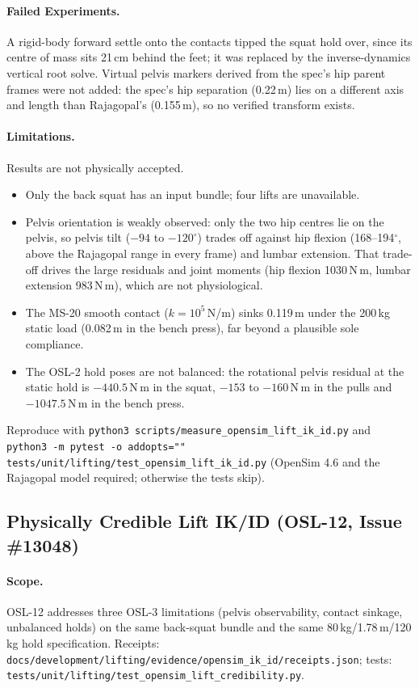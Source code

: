 \documentclass[11pt,a4paper]{article}
\begin{document}
\paragraph{Failed Experiments.} A rigid-body forward settle onto the contacts
tipped the squat hold over, since its centre of mass sits 21\,cm behind the
feet; it was replaced by the inverse-dynamics vertical root solve. Virtual
pelvis markers derived from the spec's hip parent frames were not added: the
spec's hip separation (0.22\,m) lies on a different axis and length than
Rajagopal's (0.155\,m), so no verified transform exists.

\paragraph{Limitations.} Results are not physically accepted.
\begin{itemize}[nosep]
\item Only the back squat has an input bundle; four lifts are unavailable.
\item Pelvis orientation is weakly observed: only the two hip centres lie on
  the pelvis, so pelvis tilt ($-94$ to $-120^\circ$) trades off against hip
  flexion (168--194$^\circ$, above the Rajagopal range in every frame) and
  lumbar extension. That trade-off drives the large residuals and joint
  moments (hip flexion 1030\,N\,m, lumbar extension 983\,N\,m), which are not
  physiological.
\item The MS-20 smooth contact ($k = 10^5$\,N/m) sinks 0.119\,m under the
  200\,kg static load (0.082\,m in the bench press), far beyond a plausible
  sole compliance.
\item The OSL-2 hold poses are not balanced: the rotational pelvis residual at
  the static hold is $-440.5$\,N\,m in the squat, $-153$ to $-160$\,N\,m in the
  pulls and $-1047.5$\,N\,m in the bench press.
\end{itemize}
Reproduce with \texttt{python3 scripts/measure\_opensim\_lift\_ik\_id.py} and
\texttt{python3 -m pytest -o addopts="" tests/unit/lifting/test\_opensim\_lift\_ik\_id.py}
(OpenSim 4.6 and the Rajagopal model required; otherwise the tests skip).

\subsection{Physically Credible Lift IK/ID (OSL-12, Issue \#13048)}
\paragraph{Scope.} OSL-12 addresses three OSL-3 limitations (pelvis
observability, contact sinkage, unbalanced holds) on the same back-squat
bundle and the same 80\,kg/1.78\,m/120\,kg hold specification. Receipts:
\texttt{docs/development/lifting/evidence/opensim\_ik\_id/receipts.json};
tests: \texttt{tests/unit/lifting/test\_opensim\_lift\_credibility.py}.
\end{document}

